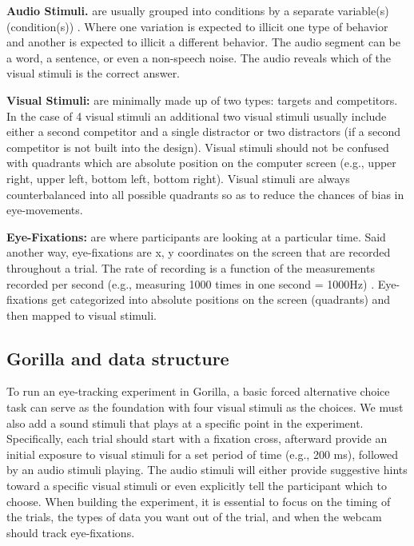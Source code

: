 \textbf{Audio Stimuli.} are usually grouped into conditions by a separate variable(s) (condition(s)) . Where one variation is expected to illicit one type of behavior and another is expected to illicit a different behavior. The audio segment can be a word, a sentence, or even a non-speech noise. The audio reveals which of the visual stimuli is the correct answer. 

\textbf{Visual Stimuli:} are minimally made up of two types: targets and competitors. In the case of 4 visual stimuli an additional two visual stimuli usually include either a second competitor and a single distractor or two distractors (if a second competitor is not built into the design). Visual stimuli should not be confused with quadrants which are absolute position on the computer screen (e.g., upper right, upper left, bottom left, bottom right). Visual stimuli are always counterbalanced into all possible quadrants so as to reduce the chances of bias in eye-movements. 

\textbf{Eye-Fixations:} are where participants are looking at a particular time. Said another way, eye-fixations are x, y coordinates on the screen that are recorded throughout a trial. The rate of recording is a function of the measurements recorded per second (e.g., measuring 1000 times in one second = 1000Hz) . Eye-fixations get categorized into absolute positions on the screen (quadrants) and then mapped to visual stimuli.

\subsection{Gorilla and data structure}

To run an eye-tracking experiment in Gorilla, a basic forced alternative choice task can serve as the foundation with four visual stimuli as the choices. We must also add a sound stimuli that plays at a specific point in the experiment. Specifically, each trial should start with a fixation cross, afterward provide an initial exposure to visual stimuli for a set period of time (e.g., 200 ms), followed by an audio stimuli playing. The audio stimuli will either provide suggestive hints toward a specific visual stimuli or even explicitly tell the participant which to choose. When building the experiment, it is essential to focus on the timing of the trials, the types of data you want out of the trial, and when the webcam should track eye-fixations. 

